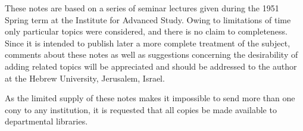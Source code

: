 These notes are based on a series of seminar lectures given during the 1951
Spring term at the Institute for Advanced Study. Owing to limitations of time
only particular topics were considered, and there is no claim to completeness.
Since it is intended to publish later a more complete treatment of the subject,
comments about these notes as well as suggestions concerning the desirability
of adding related topics will be appreciated and should be addressed to the
author at the Hebrew University, Jerusalem, Israel.

As the limited supply of these notes makes it impossible to send more than one
cony to any institution, it is requested that all copies be made available to
departmental libraries.
